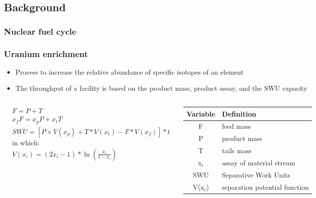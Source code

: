 \subsection{Background}
\begin{frame}
    \frametitle{Nuclear fuel cycle}
    
\end{frame}

\begin{frame}
    \frametitle{Uranium enrichment}
    \begin{itemize}
        \item Process to increase the relative abundance of specific
              isotopes of an element
        \pause
        \item The throughput of a facility is based on the product 
              mass, product assay, and the \gls{SWU} capacity
    \end{itemize}
    \pause
    \vspace{-0.5cm}
    \begin{columns}
        \column{6.5cm}
            \begin{align*}
                    & F = P + T \\
                    & x_fF = x_pP + x_tT\\
                    & SWU = \left[P\times V(x_p) +T*V(x_t) - F*V(x_f)\right]*t\\
                    & \text{in which:}\\
                    & V(x_i) = (2x_i - 1)*\ln\left(\frac{x_i}{1-x_i}\right)
            \end{align*}
            \vspace{-0.5cm}
            
    \column{3.5cm}
    \begin{table}
        \centering
        \vspace{-0.3cm}
        \begin{tabular}{c m{2cm}}
            \hline
            Variable & Definition \\
            \hline
            F & feed mass \\
            P & product mass \\
            T & tails mass\\
            x$_i$ & assay of material stream \\
            SWU & Separative Work Units\\
            V(x$_i$) & separation potential function\\
            \hline
        \end{tabular}
    \end{table}

    \end{columns}
\end{frame}

